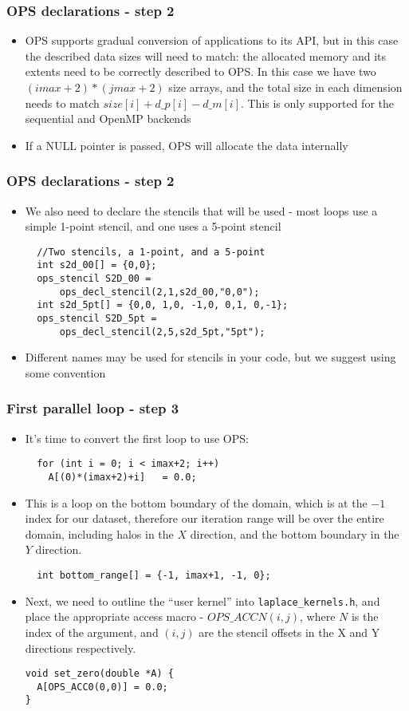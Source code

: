 \documentclass{beamer}
\begin{document}
\begin{frame}[fragile]
\frametitle{OPS declarations - step 2}
\begin{itemize}
  \item OPS supports gradual conversion of applications to its API, but in this case the described data sizes will need to match: the allocated memory and its extents need to be correctly described to OPS. In this case we have two $(imax+2)*(jmax+2)$ size arrays, and the total size in each dimension needs to match $size[i]+d\_p[i]-d\_m[i]$. This is only supported for the sequential and OpenMP backends
  \item If a NULL pointer is passed, OPS will allocate the data internally
\end{itemize}
\end{frame}

\begin{frame}[fragile]
\frametitle{OPS declarations - step 2}
\begin{itemize}
\item We also need to declare the stencils that will be used - most loops use a simple 1-point stencil, and one uses a 5-point stencil
\begin{lstlisting}
  //Two stencils, a 1-point, and a 5-point
  int s2d_00[] = {0,0};
  ops_stencil S2D_00 = 
      ops_decl_stencil(2,1,s2d_00,"0,0");
  int s2d_5pt[] = {0,0, 1,0, -1,0, 0,1, 0,-1};
  ops_stencil S2D_5pt = 
      ops_decl_stencil(2,5,s2d_5pt,"5pt");
  \end{lstlisting}
  \item Different names may be used for stencils in your code, but we suggest using some convention
\end{itemize}
\end{frame}

\begin{frame}[fragile]
\frametitle{First parallel loop - step 3}
\begin{itemize}
\item It's time to convert the first loop to use OPS:
\begin{lstlisting}
  for (int i = 0; i < imax+2; i++)
    A[(0)*(imax+2)+i]   = 0.0;
\end{lstlisting}
  \item This is a loop on the bottom boundary of the domain, which is at the $-1$ index for our dataset, therefore our iteration range will be over the entire domain, including halos in the $X$ direction, and the bottom boundary in the $Y$ direction.
  \begin{lstlisting}
  int bottom_range[] = {-1, imax+1, -1, 0};
\end{lstlisting}
\item Next, we need to outline the ``user kernel'' into \texttt{laplace\_kernels.h}, and place the appropriate access macro - $OPS\_ACCN(i,j)$, where $N$ is the index of the argument, and $(i,j)$ are the stencil offsets in the X and Y directions respectively.
\begin{lstlisting}
void set_zero(double *A) {
  A[OPS_ACC0(0,0)] = 0.0;
}
\end{lstlisting}
\end{itemize}
\end{frame}
\end{document}
